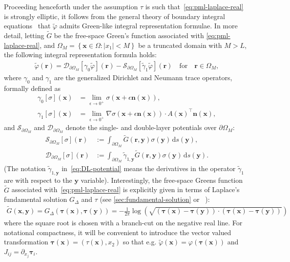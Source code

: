 \documentclass[11pt]{article}
\newcommand{\bn}{\mathbf{n}}
\newcommand{\bx}{\mathbf{x}}
\newcommand{\btau}{\boldsymbol{\tau}}
\newcommand{\by}{\mathbf{y}}
\newcommand{\br}{\boldsymbol{r}}
\newcommand{\de}{\,\mathrm{d}}
\newcommand{\tvarphi}{\tilde \varphi}
\begin{document}
Proceeding henceforth under the assumption $\tau$ is such
that~\cref{eq:pml-laplace-real} is strongly elliptic, it follows from the
general theory of boundary integral equations~\cite{mclean2000strongly} that
$\tvarphi$ admits Green-like integral representation formulae. In more detail,
letting $\tilde{G}$ be the free-space Green's function associated with
\cref{eq:pml-laplace-real}, and $\Omega_M = \left\{\bx \in \Omega : |x_1| <  M
\right\}$ be a truncated domain with $M>L$, the following integral
representation formula holds:
\begin{align}
  \label{eq:greens-representation-bounded}
  \tvarphi(\br) = \mathcal{D}_{\partial \Omega_M}[\gamma_0\tvarphi](\br) - \mathcal{S}_{\partial \Omega_M}[\tilde{\gamma}_1 {\tvarphi}](\br) \quad \mbox{for} \quad \br \in \Omega_M,
\end{align}
where $\gamma_0$ and $\gamma_1$ are the generalized Dirichlet and Neumann trace
operators, formally defined as 
\begin{subequations}
\label{eq:traces}  
\begin{align}
  \label{eq:dir-trace}
  \gamma_0[\sigma](\bx) &= \lim_{\epsilon \to 0^+} \sigma(\bx + \epsilon \bn(\bx)),\\
  \label{eq:neu-trace}
  \gamma_1[\sigma](\bx) &= \lim_{\epsilon \to 0^+} \nabla \sigma(\bx + \epsilon \bn(\bx)) \cdot A(\bx)^\top \bn(\bx),
\end{align}
\end{subequations}
and $\mathcal{S}_{\partial \Omega_M}$ and $\mathcal{D}_{\partial \Omega_M}$ denote the single- and
double-layer potentials over $\partial \Omega_M$:
\begin{subequations}\label{eq:potentials}
  \begin{align}
    \label{eq:SL-potential}  
    \mathcal{S}_{\partial \Omega_M}[\sigma](\br) &:= \int_{\partial \Omega_M} {\tilde{G}}(\br, \by)\sigma(\by) \de s(\by), \\
    \label{eq:DL-potential}  
    \mathcal{D}_{\partial \Omega_M}[\sigma](\br) &:= \int_{\partial \Omega_M} \tilde{\gamma}_{1,\by}{\tilde{G}}(\br, \by) \sigma(\by) \de s(\by).
  \end{align}
\end{subequations}
(The notation $\tilde{\gamma}_{1,\by}$ in~\eqref{eq:DL-potential} means the
derivatives in the operator $\tilde{\gamma}_1$ are with respect to the $\by$
variable). Interestingly, the free-space Greens function $\tilde{G}$ associated
with~\cref{eq:pml-laplace-real} is explicitly given in terms of Laplace's
fundamental solution $G_\Delta$ and $\tau$ (see \cref{sec:fundamental-solution} or ~\cite{kim2010analysis}):
\begin{align}
  \label{eq:complex-Green-function}
\tilde{G}(\bx,\by) = G_{\Delta}(\btau(\bx),\btau(\by)) = -\frac{1}{2\pi}\log \left( \sqrt{(\btau(\bx)-\btau(\by))\cdot(\btau(\bx)-\boldsymbol{\tau}(\by))} \right) 
\end{align}
where the square root is chosen with a branch-cut on the negative real line. For
notational compactness, it will be convenient to introduce the vector valued
transformation $\btau(\bx) = (\tau(\bx),x_2)$ so that e.g. $\tvarphi(\bx) =
\varphi(\btau(\bx))$ and $J_{ij} = \partial_{x_j} \btau_i$. 
\end{document}
